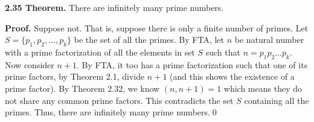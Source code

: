 \documentclass[12pt]{article}
\begin{document}
\noindent\textbf{2.35 Theorem.} There are infinitely many prime numbers.

\bigskip

\noindent\textbf{Proof.} Suppose not. That is, suppose there is only a finite number of primes. Let $S=\{p_1,p_2,...,p_k\}$ be the set of all the primes. By FTA, let $n$ be  natural number with a prime factorization of all the elements in set $S$ such that $n=p_1p_2...p_k$. Now consider $n+1$. By FTA, it too has a prime factorization such that one of its prime factors, by Theorem 2.1, divide $n+1$ (and this shows the existence of a prime factor). By Theorem 2.32, we know $(n,n+1)=1$ which means they do not share any common prime factors. This contradicts the set $S$ containing all the primes. Thus, there are infinitely many prime numbers.\qed
\end{document}
